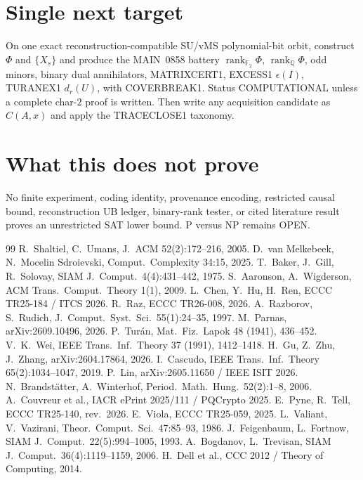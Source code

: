 \documentclass[11pt]{article}
\begin{document}
\section*{Single next target}
On one exact reconstruction-compatible SU/vMS polynomial-bit orbit, construct $\Phi$ and
$\{X_s\}$ and produce the MAIN~0858 battery
$\operatorname{rank}_{\mathbb F_2}\Phi$, $\operatorname{rank}_{\mathbb Q}\Phi$, odd minors,
binary dual annihilators, MATRIXCERT1, EXCESS1 $\epsilon(I)$, TURANEX1 $d_r(U)$, with
COVERBREAK1. Status COMPUTATIONAL unless a complete char-$2$ proof is written. Then write any
acquisition candidate as $C(A,x)$ and apply the TRACECLOSE1 taxonomy.

\section*{What this does not prove}
No finite experiment, coding identity, provenance encoding, restricted causal bound,
reconstruction UB ledger, binary-rank tester, or cited literature result proves an unrestricted
SAT lower bound. P versus NP remains OPEN.

\begin{thebibliography}{99}
 R.~Shaltiel, C.~Umans, J.~ACM 52(2):172--216, 2005.
 D.~van Melkebeek, N.~Mocelin Sdroievski, Comput.\ Complexity 34:15, 2025.
 T.~Baker, J.~Gill, R.~Solovay, SIAM J.\ Comput.\ 4(4):431--442, 1975.
 S.~Aaronson, A.~Wigderson, ACM Trans.\ Comput.\ Theory 1(1), 2009.
 L.~Chen, Y.~Hu, H.~Ren, ECCC TR25-184 / ITCS 2026.
 R.~Raz, ECCC TR26-008, 2026.
 A.~Razborov, S.~Rudich, J.\ Comput.\ Syst.\ Sci.\ 55(1):24--35, 1997.
 M.~Parnas, arXiv:2609.10496, 2026.
 P.~Tur\'an, Mat.\ Fiz.\ Lapok 48 (1941), 436--452.
 V.~K.~Wei, IEEE Trans.\ Inf.\ Theory 37 (1991), 1412--1418.
 H.~Gu, Z.~Zhu, J.~Zhang, arXiv:2604.17864, 2026.
 I.~Cascudo, IEEE Trans.\ Inf.\ Theory 65(2):1034--1047, 2019.
 P.~Lin, arXiv:2605.11650 / IEEE ISIT 2026.
 N.~Brandst\"atter, A.~Winterhof, Period.\ Math.\ Hung.\ 52(2):1--8, 2006.
 A.~Couvreur et al., IACR ePrint 2025/111 / PQCrypto 2025.
 E.~Pyne, R.~Tell, ECCC TR25-140, rev.\ 2026.
 E.~Viola, ECCC TR25-059, 2025.
 L.~Valiant, V.~Vazirani, Theor.\ Comput.\ Sci.\ 47:85--93, 1986.
 J.~Feigenbaum, L.~Fortnow, SIAM J.\ Comput.\ 22(5):994--1005, 1993.
 A.~Bogdanov, L.~Trevisan, SIAM J.\ Comput.\ 36(4):1119--1159, 2006.
 H.~Dell et al., CCC 2012 / Theory of Computing, 2014.
\end{thebibliography}

\end{document}
